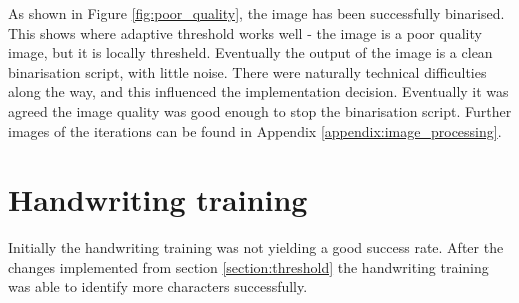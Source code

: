 As shown in Figure \ref{fig:poor_quality}, the image has been successfully binarised. This shows where adaptive threshold works well - the image is a poor quality image, but it is locally thresheld. Eventually the output of the image is a clean binarisation script, with little noise. There were naturally technical difficulties along the way, and this influenced the implementation decision. Eventually it was agreed the image quality was good enough to stop the binarisation script. Further images of the iterations can be found in Appendix \ref{appendix:image_processing}.

\section{Handwriting training}
Initially the handwriting training was not yielding a good success rate. After the changes implemented from section \ref{section:threshold} the handwriting training was able to identify more characters successfully.

